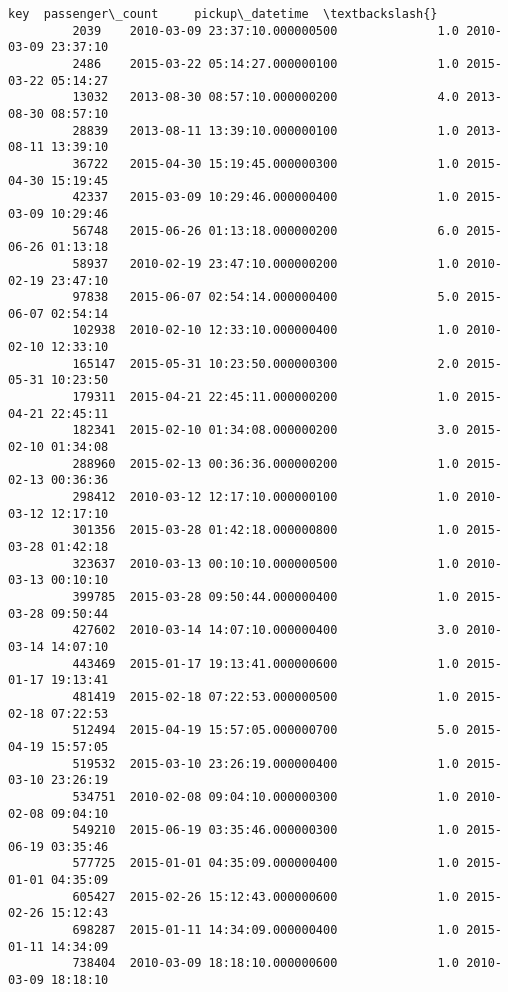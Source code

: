\documentclass[11pt]{article}
\begin{document}
\begin{Verbatim}[commandchars=\\\{\}]
                                           key  passenger\_count     pickup\_datetime  \textbackslash{}
         2039    2010-03-09 23:37:10.000000500              1.0 2010-03-09 23:37:10   
         2486    2015-03-22 05:14:27.000000100              1.0 2015-03-22 05:14:27   
         13032   2013-08-30 08:57:10.000000200              4.0 2013-08-30 08:57:10   
         28839   2013-08-11 13:39:10.000000100              1.0 2013-08-11 13:39:10   
         36722   2015-04-30 15:19:45.000000300              1.0 2015-04-30 15:19:45   
         42337   2015-03-09 10:29:46.000000400              1.0 2015-03-09 10:29:46   
         56748   2015-06-26 01:13:18.000000200              6.0 2015-06-26 01:13:18   
         58937   2010-02-19 23:47:10.000000200              1.0 2010-02-19 23:47:10   
         97838   2015-06-07 02:54:14.000000400              5.0 2015-06-07 02:54:14   
         102938  2010-02-10 12:33:10.000000400              1.0 2010-02-10 12:33:10   
         165147  2015-05-31 10:23:50.000000300              2.0 2015-05-31 10:23:50   
         179311  2015-04-21 22:45:11.000000200              1.0 2015-04-21 22:45:11   
         182341  2015-02-10 01:34:08.000000200              3.0 2015-02-10 01:34:08   
         288960  2015-02-13 00:36:36.000000200              1.0 2015-02-13 00:36:36   
         298412  2010-03-12 12:17:10.000000100              1.0 2010-03-12 12:17:10   
         301356  2015-03-28 01:42:18.000000800              1.0 2015-03-28 01:42:18   
         323637  2010-03-13 00:10:10.000000500              1.0 2010-03-13 00:10:10   
         399785  2015-03-28 09:50:44.000000400              1.0 2015-03-28 09:50:44   
         427602  2010-03-14 14:07:10.000000400              3.0 2010-03-14 14:07:10   
         443469  2015-01-17 19:13:41.000000600              1.0 2015-01-17 19:13:41   
         481419  2015-02-18 07:22:53.000000500              1.0 2015-02-18 07:22:53   
         512494  2015-04-19 15:57:05.000000700              5.0 2015-04-19 15:57:05   
         519532  2015-03-10 23:26:19.000000400              1.0 2015-03-10 23:26:19   
         534751  2010-02-08 09:04:10.000000300              1.0 2010-02-08 09:04:10   
         549210  2015-06-19 03:35:46.000000300              1.0 2015-06-19 03:35:46   
         577725  2015-01-01 04:35:09.000000400              1.0 2015-01-01 04:35:09   
         605427  2015-02-26 15:12:43.000000600              1.0 2015-02-26 15:12:43   
         698287  2015-01-11 14:34:09.000000400              1.0 2015-01-11 14:34:09   
         738404  2010-03-09 18:18:10.000000600              1.0 2010-03-09 18:18:10   

\end{Verbatim}
\end{document}
